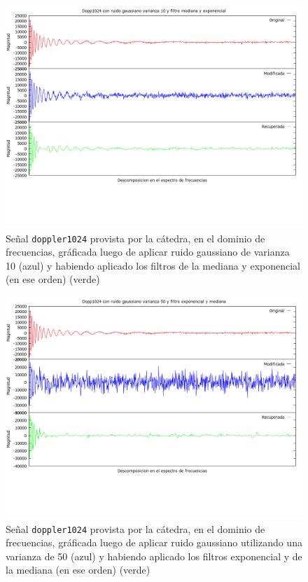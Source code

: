 \begin{figure}[H]
\begin {center}
\includegraphics[width=500pt]{imagenes/dopp1024-gauss-10-both.png}
\end {center}
\caption{Se\~nal \texttt{doppler1024} provista por la c\'atedra, en el dominio de frecuencias, gr\'aficada
    luego de aplicar ruido gaussiano de varianza 10 (azul) y 
habiendo aplicado los filtros de la mediana y exponencial (en ese orden) (verde)}
\label{fig:gcomb}
\end{figure}

\begin{figure}[H]
\begin {center}
\includegraphics[width=500pt]{imagenes/dopp1024-gauss-50-bothr.png}
\end {center}
\caption{Se\~nal \texttt{doppler1024} provista por la c\'atedra, en el dominio de frecuencias, gr\'aficada
luego de aplicar ruido gaussiano utilizando una varianza de 50 (azul) y 
habiendo aplicado los filtros exponencial y de la mediana (en ese orden) (verde)}
\label{fig:dopcomb}
\end{figure}

